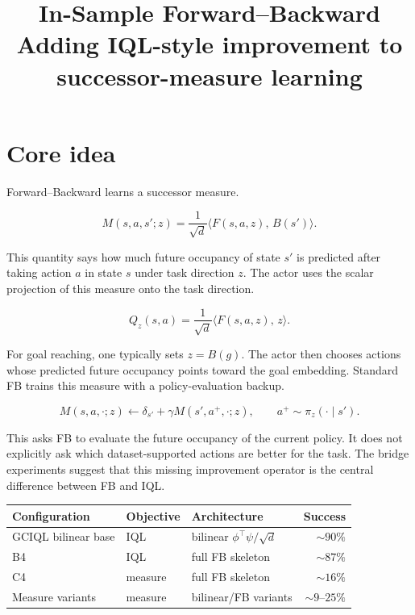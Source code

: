 \documentclass[11pt]{article}
\title{\textbf{In-Sample Forward--Backward}\\[3pt]\large Adding IQL-style improvement to successor-measure learning}
\author{}
\date{}
\newcommand{\inner}[2]{\langle #1,\, #2\rangle}
\newcommand{\Fmap}{F}
\newcommand{\Bmap}{B}
\begin{document}
\maketitle

\section{Core idea}

Forward--Backward learns a successor measure.

\begin{equation}
M(s,a,s';z)=\frac{1}{\sqrt d}\inner{\Fmap(s,a,z)}{\Bmap(s')}.
\end{equation}

This quantity says how much future occupancy of state $s'$ is predicted after taking action $a$ in state $s$ under task direction $z$.
The actor uses the scalar projection of this measure onto the task direction.

\begin{equation}
Q_z(s,a)=\frac{1}{\sqrt d}\inner{\Fmap(s,a,z)}{z}.
\end{equation}

For goal reaching, one typically sets $z=\Bmap(g)$.
The actor then chooses actions whose predicted future occupancy points toward the goal embedding.
Standard FB trains this measure with a policy-evaluation backup.

\begin{equation}
M(s,a,\cdot;z)\leftarrow \delta_{s'}+\gamma M(s',a^+,\cdot;z),\qquad a^+\sim\pi_z(\cdot\mid s').
\end{equation}

This asks FB to evaluate the future occupancy of the current policy.
It does not explicitly ask which dataset-supported actions are better for the task.
The bridge experiments suggest that this missing improvement operator is the central difference between FB and IQL.

\begin{center}
\begin{tabular}{@{}lll r@{}}
\toprule
\textbf{Configuration} & \textbf{Objective} & \textbf{Architecture} & \textbf{Success} \\
\midrule
GCIQL bilinear base & IQL & bilinear $\phi^\top\psi/\sqrt d$ & ${\sim}90\%$ \\
B4 & IQL & full FB skeleton & ${\sim}87\%$ \\
C4 & measure & full FB skeleton & ${\sim}16\%$ \\
Measure variants & measure & bilinear/FB variants & ${\sim}9$--$25\%$ \\
\bottomrule
\end{tabular}
\end{center}
\end{document}
